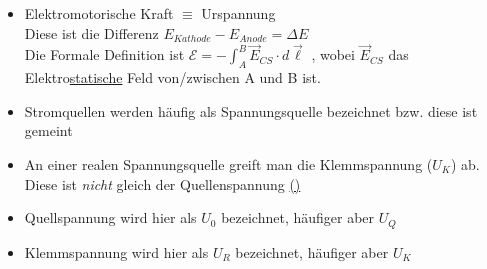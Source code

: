 \begin{itemize}
	\item Elektromotorische Kraft $ \equiv $ Urspannung \\
	Diese ist die Differenz $ E_{Kathode} - E_{Anode} = \Delta E  $\\
	Die Formale Definition ist $ \mathcal{E} = - {\displaystyle \int_{A}^{B} \vec{E}_{CS} \cdot d\vec{\ell} } $ \hspace{5mm}, wobei $ \vec{E}_{CS} $ das Elektro\underline{statische} Feld von/zwischen A und B ist. 
	\item Stromquellen werden häufig als Spannungsquelle bezeichnet bzw. diese ist gemeint
	\item An einer realen Spannungsquelle greift man die Klemmspannung ($ U_K $) ab. Diese ist \emph{nicht} gleich der Quellenspannung \hyperlink{UR}{(\textasteriskcentered)}
	\item Quellspannung wird hier als $ U_0 $ bezeichnet, häufiger aber $ U_Q $
	\item Klemmspannung wird hier als $ U_R $ bezeichnet, häufiger aber $ U_K $
\end{itemize}

